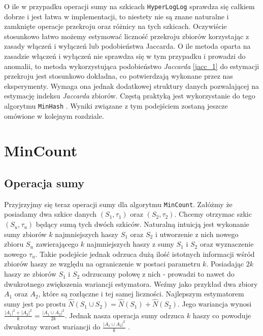 O ile w przypadku operacji sumy na szkicach \texttt{HyperLogLog} sprawdza się całkiem dobrze i jest  łatwa w implementacji, to niestety nie są znane naturalne i zamknięte operacje przekroju oraz różnicy na tych szkicach. Oczywiście stosunkowo łatwo możemy estymować liczność przekroju zbiorów korzystając z zasady włączeń i wyłączeń lub podobieństwa Jaccarda.
O ile metoda oparta na zasadzie włączeń i wyłączeń nie sprawdza się w tym przypadku i prowadzi do anomalii, to metoda wykorzystująca podobieństwo \textit{Jaccarda} \ref{jacc_1} do estymacji przekroju jest stosunkowo dokładna, co potwierdzają wykonane przez nas eksperymenty. Wymaga ona jednak dodatkowej struktury danych pozwalającej na estymację indeksu \textit{Jaccarda} zbiorów. Częstą praktyką jest wykorzystanie do tego algorytmu \texttt{MinHash} \cite{adroll}. Wyniki związane z tym podejściem zostaną jeszcze omówione w kolejnym rozdziale.

\section{MinCount}

\subsection{Operacja sumy}

Przyjrzyjmy się teraz operacji sumy dla algorytmu \texttt{MinCount}. Załóżmy że posiadamy dwa szkice danych $(S_1, {\tau}_1)$ oraz $(S_2, {\tau}_2)$. Chcemy otrzymac szkic $(S_u, {\tau}_u)$ będący sumą tych dwóch szkiców. Naturalną intuicją jest wykonanie sumy zbiorów $k$ najmniejszych haszy $S_1$ oraz $S_2$ i utworzenie z nich nowego zbioru $S_u$ zawierającego $k$ najmniejszych haszy z sumy $S_1$ i $S_2$ oraz wyznaczenie nowego ${\tau}_u$. Takie podejście jednak odrzuca dużą ilość istotnych informacji wśród zbiorów haszy ze względu na ograniczenie w postaci parametru $k$. Posiadając $2k$ haszy ze zbiorów $S_1$ i $S_2$ odrzucamy połowę z nich - prowadzi to nawet do dwukrotnego zwiększenia wariancji estymatora. Weźmy jako przykład dwa zbiory $A_1$ oraz $A_2$, które są rozłączne i tej samej liczności. Najlepszym estymatorem sumy jest po prostu $\hat{N}(S_1 \cup S_2) = \hat{N}(S_1) + \hat{N}(S_2)$. Jego wariancja wynosi $\frac{|A_1|^2 + |A_2|^2}{k} = \frac{|A_1 \cup A_2|^2}{2k}$. Jednak nasza operacja sumy odrzuca $k$ haszy co powoduje dwukrotny wzrost wariancji do $\frac{|A_1 \cup A_2|^2}{k}$ \cite{ting}.

